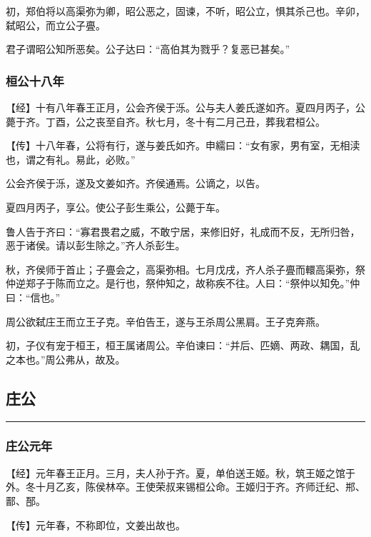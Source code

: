 \documentclass[]{article}
\begin{document}
初，郑伯将以高渠弥为卿，昭公恶之，固谏，不听，昭公立，惧其杀己也。辛卯，弑昭公，而立公子亹。

君子谓昭公知所恶矣。公子达曰：``高伯其为戮乎？复恶已甚矣。''

\hypertarget{header-n340}{%
\subsubsection{桓公十八年}\label{header-n340}}

【经】十有八年春王正月，公会齐侯于泺。公与夫人姜氏遂如齐。夏四月丙子，公薨于齐。丁酉，公之丧至自齐。秋七月，冬十有二月己丑，葬我君桓公。

【传】十八年春，公将有行，遂与姜氏如齐。申繻曰：``女有家，男有室，无相渎也，谓之有礼。易此，必败。''

公会齐侯于泺，遂及文姜如齐。齐侯通焉。公谪之，以告。

夏四月丙子，享公。使公子彭生乘公，公薨于车。

鲁人告于齐曰：``寡君畏君之威，不敢宁居，来修旧好，礼成而不反，无所归咎，恶于诸侯。请以彭生除之。''齐人杀彭生。

秋，齐侯师于首止；子亹会之，高渠弥相。七月戊戌，齐人杀子亹而轘高渠弥，祭仲逆郑子于陈而立之。是行也，祭仲知之，故称疾不往。人曰：``祭仲以知免。''仲曰：``信也。''

周公欲弑庄王而立王子克。辛伯告王，遂与王杀周公黑肩。王子克奔燕。

初，子仪有宠于桓王，桓王属诸周公。辛伯谏曰：``并后、匹嫡、两政、耦国，乱之本也。''周公弗从，故及。

\hypertarget{header-n353}{%
\subsection{庄公}\label{header-n353}}

\begin{center}\rule{0.5\linewidth}{\linethickness}\end{center}

\hypertarget{header-n355}{%
\subsubsection{庄公元年}\label{header-n355}}

【经】元年春王正月。三月，夫人孙于齐。夏，单伯送王姬。秋，筑王姬之馆于外。冬十月乙亥，陈侯林卒。王使荣叔来锡桓公命。王姬归于齐。齐师迁纪、郱、鄑、郚。

【传】元年春，不称即位，文姜出故也。
\end{document}
